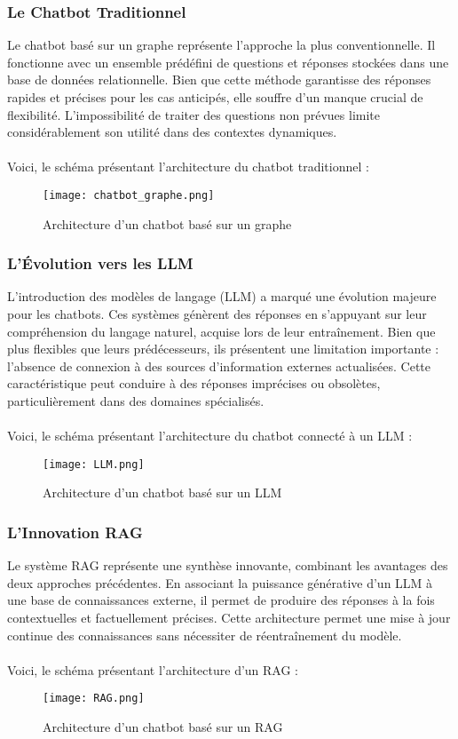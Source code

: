 \documentclass{article}
\begin{document}
    \subsubsection{Le Chatbot Traditionnel}
    \quad Le chatbot basé sur un graphe représente l'approche la plus conventionnelle. Il fonctionne avec un ensemble prédéfini de questions et réponses stockées dans une base de données relationnelle. Bien que cette méthode garantisse des réponses rapides et précises pour les cas anticipés, elle souffre d'un manque crucial de flexibilité. L'impossibilité de traiter des questions non prévues limite considérablement son utilité dans des contextes dynamiques.\\
    \\
    Voici, le schéma présentant l'architecture du chatbot traditionnel : 
    \begin{figure}[ht]
        \centering
        \texttt{[image: chatbot\_graphe.png]}
        \caption{Architecture d’un chatbot basé sur un graphe}
    \end{figure}
    
    \subsubsection{L'Évolution vers les LLM}
    \quad L'introduction des modèles de langage (LLM) a marqué une évolution majeure pour les chatbots. Ces systèmes génèrent des réponses en s'appuyant sur leur compréhension du langage naturel, acquise lors de leur entraînement. Bien que plus flexibles que leurs prédécesseurs, ils présentent une limitation importante : l'absence de connexion à des sources d'information externes actualisées. Cette caractéristique peut conduire à des réponses imprécises ou obsolètes, particulièrement dans des domaines spécialisés.\\
    \\
    Voici, le schéma présentant l'architecture du chatbot connecté à un LLM : 
    \begin{figure}[ht]
        \centering
        \texttt{[image: LLM.png]}
        \caption{Architecture d’un chatbot basé sur un LLM}
    \end{figure}
    
    \subsubsection{L'Innovation RAG}
    \quad Le système RAG représente une synthèse innovante, combinant les avantages des deux approches précédentes. En associant la puissance générative d'un LLM à une base de connaissances externe, il permet de produire des réponses à la fois contextuelles et factuellement précises. Cette architecture permet une mise à jour continue des connaissances sans nécessiter de réentraînement du modèle.\\
    \\
    Voici, le schéma présentant l'architecture d'un RAG :
    \begin{figure}[ht]
        \centering
        \texttt{[image: RAG.png]}
        \caption{Architecture d’un chatbot basé sur un RAG}
    \end{figure}
\end{document}

